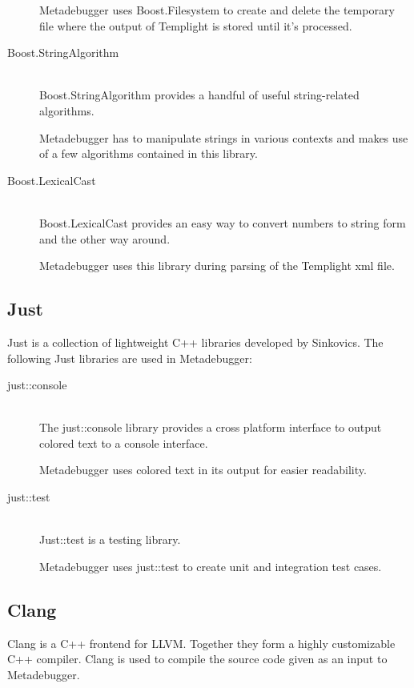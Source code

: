 \begin{description}
        Metadebugger uses Boost.Filesystem to create and delete the temporary
        file where the output of Templight is stored until it's processed.
    \item[Boost.StringAlgorithm]\cite{boost-string} \hfill \\
        Boost.StringAlgorithm provides a handful of useful string-related
        algorithms.

        Metadebugger has to manipulate strings in various contexts and makes
        use of a few algorithms contained in this library.
    \item[Boost.LexicalCast]\cite{boost-lexicalcast} \hfill \\
        Boost.LexicalCast provides an easy way to convert numbers to string
        form and the other way around.

        Metadebugger uses this library during parsing of the Templight xml
        file.

\end{description}

\subsection{Just\cite{just}}

Just is a collection of lightweight C++ libraries developed by Sinkovics. The
following Just libraries are used in Metadebugger:
\begin{description}
    \item[just::console] \hfill \\
        The just::console library provides a cross platform interface to output
        colored text to a console interface.

        Metadebugger uses colored text in its output for easier readability.
    \item[just::test] \hfill \\
        Just::test is a testing library.

        Metadebugger uses just::test to create unit and integration test cases.
\end{description}

\subsection{Clang\cite{clang}}

Clang is a C++ frontend for LLVM. Together they form a highly customizable C++
compiler. Clang is used to compile the source code given as an input to
Metadebugger.

